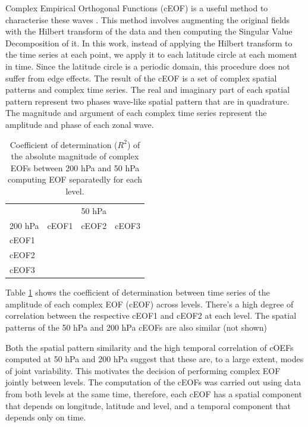 \documentclass[smallextended]{svjour3}       %
\begin{document}
Complex Empirical Orthogonal Functions (cEOF) is a useful method to characterise these waves \citep{horel1984}. This method involves augmenting the original fields with the Hilbert transform of the data and then computing the Singular Value Decomposition of it. In this work, instead of applying the Hilbert transform to the time series at each point, we apply it to each latitude circle at each moment in time. Since the latitude circle is a periodic domain, this procedure does not suffer from edge effects. The result of the cEOF is a set of complex spatial patterns and complex time series. The real and imaginary part of each spatial pattern represent two phases wave-like spatial pattern that are in quadrature. The magnitude and argument of each complex time series represent the amplitude and phase of each zonal wave.

\begin{table}

\caption{\label{tab:corr-ceof-splitted}Coefficient of determination ($R^2$) of the absolute magnitude of complex EOFs between 200 hPa and 50 hPa computing EOF separatedly for each level.}
\centering
\begin{tabular}[t]{l>{}r>{}r>{}r}
\toprule
\multicolumn{1}{c}{} & \multicolumn{3}{c}{50 hPa} \\
\cmidrule(l{3pt}r{3pt}){2-4}
200 hPa & cEOF1 & cEOF2 & cEOF3\\
\midrule
cEOF1 & \cellcolor[HTML]{E1C0BB}{\textcolor{black}{0.28}} & \cellcolor[HTML]{FDFAFA}{\textcolor{black}{0.02}} & \cellcolor[HTML]{FDFAFA}{\textcolor{black}{0.02}}\\
cEOF2 & \cellcolor[HTML]{FFFFFF}{\textcolor{black}{0.00}} & \cellcolor[HTML]{BB7A73}{\textcolor{white}{0.60}} & \cellcolor[HTML]{FDFAFA}{\textcolor{black}{0.02}}\\
cEOF3 & \cellcolor[HTML]{FFFFFF}{\textcolor{black}{0.00}} & \cellcolor[HTML]{FFFFFF}{\textcolor{black}{0.00}} & \cellcolor[HTML]{FDFCFC}{\textcolor{black}{0.01}}\\
\bottomrule
\end{tabular}
\end{table}

Table \ref{tab:corr-ceof-splitted} shows the coefficient of determination between time series of the amplitude of each complex EOF (cEOF) across levels. There's a high degree of correlation between the respective cEOF1 and cEOF2 at each level. The spatial patterns of the 50 hPa and 200 hPa cEOFs are also similar (not shown)

Both the spatial pattern similarity and the high temporal correlation of cOEFs computed at 50 hPa and 200 hPa suggest that these are, to a large extent, modes of joint variability. This motivates the decision of performing complex EOF jointly between levels. The computation of the cEOFs was carried out using data from both levels at the same time, therefore, each cEOF has a spatial component that depends on longitude, latitude and level, and a temporal component that depends only on time.
\end{document}
